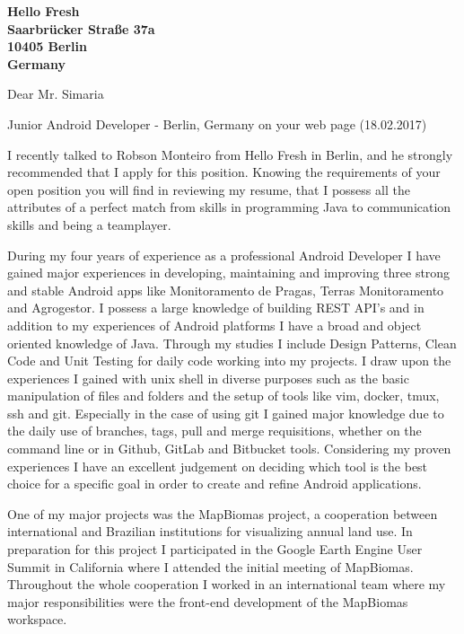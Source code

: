 \documentclass[a4paper]{joaosoares-letter}
\begin{document}
\longindentation=0pt

\begin{letter}{\bfseries Hello Fresh\\Saarbrücker Straße 37a\\10405  Berlin\\Germany}



\date{Belém, \today}

\opening{Dear Mr. Simaria}{Junior Android Developer - Berlin, Germany on your web page (18.02.2017)}

{\justifying I recently talked to Robson Monteiro from Hello Fresh in Berlin, and he strongly recommended that I apply for this position. Knowing the requirements of your open position you will find in reviewing my resume, that I possess all the attributes of a perfect match from skills in programming Java to communication skills and being a teamplayer.\par}  
{\justifying During my four years of experience as a professional Android Developer I have gained major experiences in developing, maintaining and improving three strong and stable Android apps like Monitoramento de Pragas, Terras Monitoramento and Agrogestor. I possess a large knowledge of building REST API's and in addition to my experiences of Android platforms I have a broad and object oriented knowledge of Java. Through my studies I include Design Patterns, Clean Code and Unit Testing for daily code working into my projects. I draw upon the experiences I gained with unix shell in diverse purposes such as the basic manipulation of files and folders and the setup of tools like vim, docker, tmux, ssh and git. Especially in the case of using git I gained major knowledge due to the daily use of branches, tags, pull and merge requisitions, whether on the command line or in Github, GitLab and Bitbucket tools. Considering my proven experiences I have an excellent judgement on deciding which tool is the best choice for a specific goal in order to create and refine Android applications.\par}
{\justifying One of my major projects was the MapBiomas project, a cooperation between international and Brazilian institutions for visualizing annual land use. In preparation for this project I participated in the Google Earth Engine User Summit in California where I attended the initial meeting of MapBiomas. Throughout the whole cooperation I worked in an international team where my major responsibilities were the front-end development of the MapBiomas workspace.\par}

\end{letter}
\end{document}
